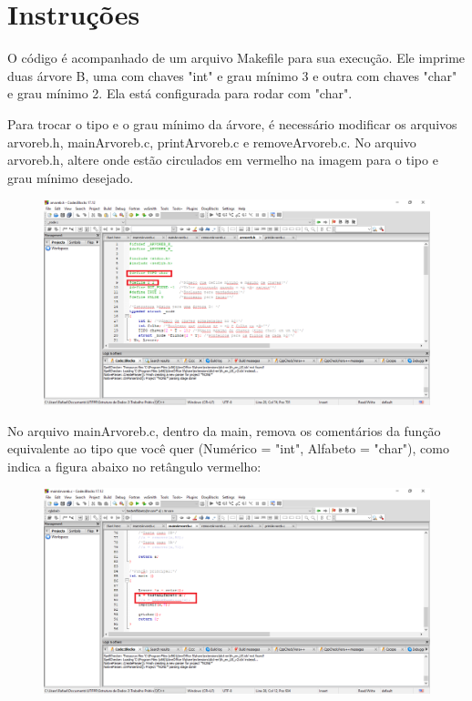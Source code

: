 \section{Instruções}
O código é acompanhado de um arquivo Makefile para sua execução. Ele imprime duas árvore B, uma com chaves "int" e grau mínimo 3 e outra com chaves "char" e grau mínimo 2. Ela está configurada para rodar com "char".
\par Para trocar o tipo e o grau mínimo da árvore, é necessário modificar os arquivos arvoreb.h, mainArvoreb.c, printArvoreb.c e removeArvoreb.c. No arquivo arvoreb.h, altere onde estão circulados em vermelho na imagem para o tipo e grau mínimo desejado.

\begin{figure}[!h]
\centering
\includegraphics[width=6in]{relatorio/imagens/imgMudarTipoH.png}
\end{figure}

\newpage

\par No arquivo mainArvoreb.c, dentro da main, remova os comentários da função equivalente ao tipo que você quer (Numérico = "int", Alfabeto = "char"), como indica a figura abaixo no retângulo vermelho:

\begin{figure}[!h]
\centering
\includegraphics[width=6in]{relatorio/imagens/imgMudarTipoMain.png}
\end{figure}

